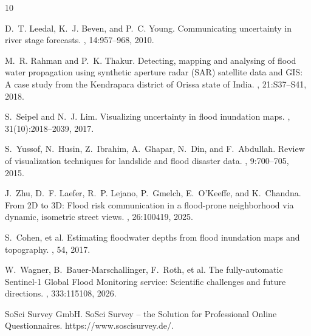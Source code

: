 \documentclass[11pt, a4paper]{article}
\begin{document}
\begin{thebibliography}{10}

D.~T. Leedal, K.~J. Beven, and P.~C. Young.
\newblock Communicating uncertainty in river stage forecasts.
, 14:957--968, 2010.

M.~R. Rahman and P.~K. Thakur.
\newblock Detecting, mapping and analysing of flood water propagation using synthetic aperture radar (SAR) satellite data and GIS: A case study from the Kendrapara district of Orissa state of India.
, 21:S37--S41, 2018.

S.~Seipel and N.~J. Lim.
\newblock Visualizing uncertainty in flood inundation maps.
, 31(10):2018--2039, 2017.

S.~Yussof, N.~Husin, Z.~Ibrahim, A.~Ghapar, N.~Din, and F.~Abdullah.
\newblock Review of visualization techniques for landslide and flood disaster data.
, 9:700--705, 2015.

J.~Zhu, D.~F. Laefer, R.~P. Lejano, P.~Gmelch, E.~O'Keeffe, and K.~Chandna.
\newblock From 2D to 3D: Flood risk communication in a flood-prone neighborhood via dynamic, isometric street views.
, 26:100419, 2025.

S.~Cohen, et al. 
\newblock Estimating floodwater depths from flood inundation maps and topography.
, 54, 2017.

W.~Wagner, B.~Bauer-Marschallinger, F.~Roth, et al.
\newblock The fully-automatic Sentinel-1 Global Flood Monitoring service: Scientific challenges and future directions.
, 333:115108, 2026.

SoSci Survey GmbH.
\newblock SoSci Survey – the Solution for Professional Online Questionnaires.
\newblock https://www.soscisurvey.de/.

\end{thebibliography}
\end{document}
